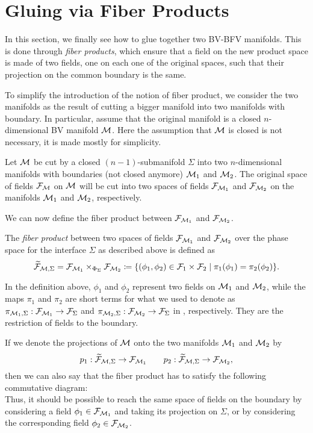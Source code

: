 \section{Gluing via Fiber Products}
\label{sec:gluing_fiber_prod}

In this section, we finally see how to glue together two BV-BFV manifolds.
This is done through \emph{fiber products}, which ensure that a field on the new product space is made of two fields, one on each one of the original spaces, such that their projection on the common boundary is the same.

To simplify the introduction of the notion of fiber product, we consider the two manifolds as the result of cutting a bigger manifold into two manifolds with boundary.
In particular, assume that the original manifold is a closed $n$-dimensional BV manifold $\mathcal{M}$.
Here the assumption that $\mathcal{M}$ is closed is not necessary, it is made mostly for simplicity.

Let $\mathcal{M}$ be cut by a closed $(n-1)$-submanifold $\Sigma$ into two $n$-dimensional manifolds with boundaries (not closed anymore) $\mathcal{M}_1$ and $\mathcal{M}_2$.
The original space of fields $\mathcal{F}_{\mathcal{M}}$ on $\mathcal{M}$ will be cut into two spaces of fields $\mathcal{F}_{\mathcal{M}_1}$ and $\mathcal{F}_{\mathcal{M}_2}$ on the manifolds $\mathcal{M}_1$ and $\mathcal{M}_2$, respectively.

We can now define the fiber product between $\mathcal{F}_{\mathcal{M}_1}$ and $\mathcal{F}_{\mathcal{M}_2}$.

\begin{definition}
    The \emph{fiber product} between two spaces of fields $\mathcal{F}_{\mathcal{M}_1}$ and $\mathcal{F}_{\mathcal{M}_2}$ over the phase space for the interface $\Sigma$ as described above is defined as
    \begin{equation}
    \label{eq:fiber_prod}
        \widetilde{\mathcal{F}}_{\mathcal{M}, \Sigma} = \mathcal{F}_{\mathcal{M}_1} \times_{\Phi_\Sigma} \mathcal{F}_{\mathcal{M}_2} 
        \coloneqq \{(\phi_1, \phi_2) \in \mathcal{F}_1 \times \mathcal{F}_2 \; | \;
        \pi_1(\phi_1) = \pi_2(\phi_2) \} .
    \end{equation}
\end{definition}

In the definition above, $\phi_1$ and $\phi_2$ represent two fields on $\mathcal{M}_1$ and $\mathcal{M}_2$, while the maps $\pi_1$ and $\pi_2$ are short terms for what we used to denote as $\pi_{\mathcal{M}_1, \Sigma}: \mathcal{F}_{\mathcal{M}_1} \rightarrow \mathcal{F}_\Sigma$ and $\pi_{\mathcal{M}_2, \Sigma}: \mathcal{F}_{\mathcal{M}_2} \rightarrow \mathcal{F}_\Sigma$ in , respectively.
They are the restriction of fields to the boundary.

If we denote the projections of $\mathcal{M}$ onto the two manifolds $\mathcal{M}_1$ and $\mathcal{M}_2$ by
\begin{equation*}
    p_1: \widetilde{\mathcal{F}}_{\mathcal{M}, \Sigma} \rightarrow \mathcal{F}_{\mathcal{M}_1} 
    \qquad
    p_2: \widetilde{\mathcal{F}}_{\mathcal{M}, \Sigma} \rightarrow \mathcal{F}_{\mathcal{M}_2},
\end{equation*}
then we can also say that the fiber product has to satisfy the following commutative diagram:
\begin{equation*}
    
\end{equation*}
Thus, it should be possible to reach the same space of fields on the boundary by considering a field $\phi_1 \in \mathcal{F}_{\mathcal{M}_1}$ and taking its projection on $\Sigma$, or by considering the corresponding field $\phi_2 \in \mathcal{F}_{\mathcal{M}_2}$.

